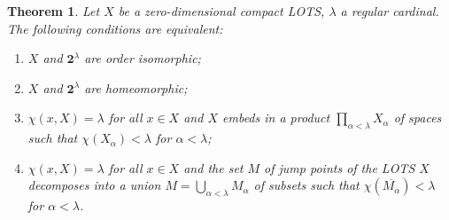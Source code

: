\documentclass[preprint]{elsarticle}
\def\al{\alpha}
\def\la{\lambda}
\def\cl#1{\overline{#1}}
\newtheorem{proposition}{Proposition}[section]
\newtheorem{theorem}{Theorem}[section]
\theoremstyle{definition}
\theoremstyle{remark}
\def\lex#1#2{\mathfrak{L}(#2^{#1})}
\def\lex#1#2{#2^{#1}}
\def\B{2}
\def\B{\mathsf{2}}
\def\B{\mathbf{2}}
\def\lexab{\lex\la\B}
\begin{document}
\begin{theorem}\label{t:blex:t1}
Let $X$ be a zero-dimensional compact LOTS, $\la$ a regular cardinal.
The following conditions are equivalent:
\begin{enumerate}
\item
$X$ and $\lexab$ are order isomorphic;
\item
$X$ and $\lexab$ are homeomorphic;
\item
$\chi(x,X)=\la$ for all $x\in X$ and $X$ embeds in a product $\prod_{\al<\la}X_\al$ of spaces such that $\chi(X_\al)<\la$ for $\al<\la$;
\item
$\chi(x,X)=\la$ for all $x\in X$ and the set $M$ of jump points of the LOTS $X$ decomposes into a union $M=\bigcup_{\al<\la} M_\al$ of subsets such that $\chi(\cl{M_\al})<\la$ for $\al<\la$.
\end{enumerate}
\end{theorem}
\end{document}
